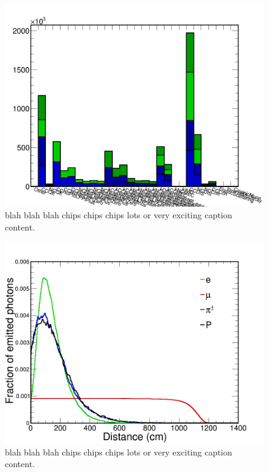 \begin{figure}
    \includegraphics[width=\largefigwidth]{diagrams/cvn/events}
    \caption[events]%
    {blah blah blah chips chips chips lots or very exciting caption content.}
    \label{fig:events}
\end{figure}

\begin{figure}
    \includegraphics[width=\largefigwidth]{diagrams/cvn/emission_distance}
    \caption[emisson_distance]%
    {blah blah blah chips chips chips lots or very exciting caption content.}
    \label{fig:emisson_distance}
\end{figure}

